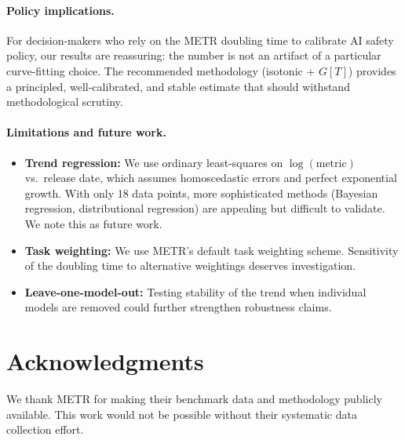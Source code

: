 \documentclass[11pt,a4paper]{article}
\begin{document}
\paragraph{Policy implications.}
For decision-makers who rely on the METR doubling time to calibrate AI safety policy, our results are reassuring: the number is not an artifact of a particular curve-fitting choice.
The recommended methodology (isotonic + $G[T]$) provides a principled, well-calibrated, and stable estimate that should withstand methodological scrutiny.

\paragraph{Limitations and future work.}
\begin{itemize}
  \item \textbf{Trend regression:} We use ordinary least-squares on $\log(\text{metric})$ vs.\ release date, which assumes homoscedastic errors and perfect exponential growth.
        With only 18 data points, more sophisticated methods (Bayesian regression, distributional regression) are appealing but difficult to validate. We note this as future work.
  \item \textbf{Task weighting:} We use METR's default task weighting scheme. Sensitivity of the doubling time to alternative weightings deserves investigation.
  \item \textbf{Leave-one-model-out:} Testing stability of the trend when individual models are removed could further strengthen robustness claims.
\end{itemize}


\section*{Acknowledgments}

We thank METR for making their benchmark data and methodology publicly available.
This work would not be possible without their systematic data collection effort.
\end{document}
